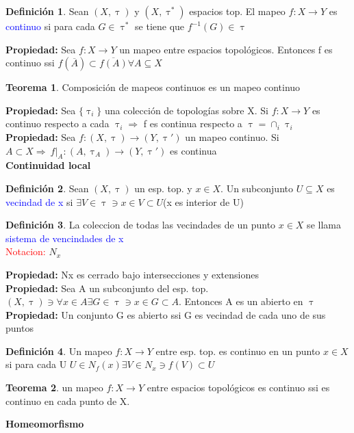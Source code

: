 \documentclass{article}
\theoremstyle{definition}
\newtheorem{definition}{Definición}[section]
\newtheorem{theorem}{Teorema}[section]
\begin{document}
\begin{definition}
	Sean $(X,\uptau)$ y $(X,\uptau^*)$ espacios top. El mapeo $f:X\to Y$ es \textcolor{blue}{continuo} si para cada $G\in\uptau^*$ se tiene que $f^{-1}(G)\in\uptau$
\end{definition}
\textbf{Propiedad: } 
Sea $f:X\to Y$ un mapeo entre espacios topológicos. Entonces f es continuo ssi $f(\overline{A})\subset \overline{f(A)}\forall A\subseteq X$
\begin{theorem}
	Composición de mapeos continuos es un mapeo continuo
\end{theorem}
\textbf{Propiedad: } 
Sea $\{\uptau_i\}$ una colección de topologías sobre X. Si $f:X\to Y$ es continuo respecto a cada $\uptau_i\Rightarrow$ f es continua respecto a $\uptau=\cap_i\uptau_i$
\textbf{Propiedad: }
Sea $f:(X,\uptau)\to(Y,\uptau ')$ un mapeo continuo. Si $A\subset X\Rightarrow\ f|_A:(A,\uptau_A)\to (Y,\uptau')$ es continua\\
\textbf{Continuidad local}\\
\begin{definition}
	Sean $(X,\uptau)$ un esp. top. y $x\in X$. Un subconjunto $U\subseteq X$ es \textcolor{blue}{vecindad de x } si $\exists V\in \uptau\ni x\in V\subset U$(x es interior de U)
\end{definition}
\begin{definition}
	La coleccion de todas las vecindades de un punto $x\in X$ se llama \textcolor{blue}{sistema de vencindades de x}\\
	\textcolor{red}{Notacion: } $N_x$
\end{definition}
\textbf{Propiedad: }
Nx es cerrado bajo intersecciones y extensiones\\
\textbf{Propiedad: }Sea A un subconjunto del esp. top. $(X,\uptau)\ni\forall x\in A\exists G\in\uptau\ni x\in G\subset A$. Entonces A es un abierto en $\uptau$\\
\textbf{Propiedad: } Un conjunto G es abierto ssi G es vecindad de cada uno de sus puntos\\
\begin{definition}
	Un mapeo $f:X\to Y$ entre esp. top. es continuo en un punto $x\in X$ si para cada U $U\in N_f(x)\exists V\in N_x\ni f(V)\subset U$
\end{definition}
\begin{theorem}
	 un mapeo $f:X\to Y$ entre espacios topológicos es continuo ssi es continuo en cada punto de X.
\end{theorem}
\begin{LARGE}
\textbf{Homeomorfismo}
\end{LARGE}
\end{document}
